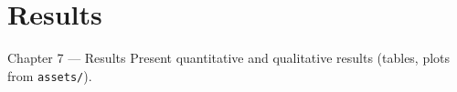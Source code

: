 \section{Results}

\begin{frame}{Chapter 7 — Results}
  Present quantitative and qualitative results (tables, plots from \texttt{assets/}).
\end{frame}
